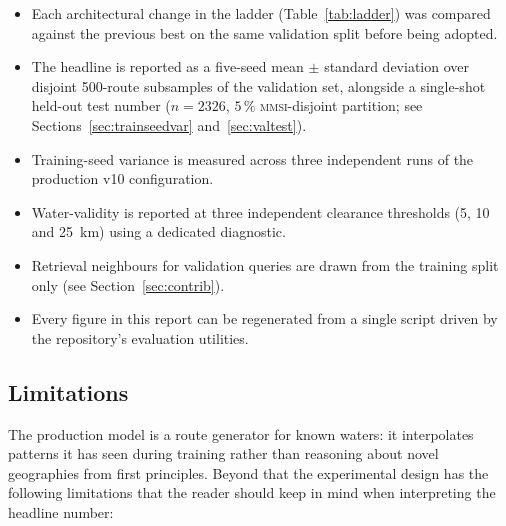 \documentclass[oneside, a4paper, onecolumn, 11pt]{article}
\begin{document}
\begin{itemize}[leftmargin=*]
  \item Each architectural change in the ladder (Table~\ref{tab:ladder})
        was compared against the previous best on the same validation
        split before being adopted.
  \item The headline is reported as a five-seed mean $\pm$ standard
        deviation over disjoint 500-route subsamples of the validation
        set, alongside a single-shot held-out test number
        ($n = 2326$, $5\,\%$ \textsc{mmsi}-disjoint partition; see
        Sections~\ref{sec:trainseedvar} and~\ref{sec:valtest}).
  \item Training-seed variance is measured across three independent
        runs of the production v10 configuration.
  \item Water-validity is reported at three independent clearance
        thresholds (5, 10 and 25~km) using a dedicated diagnostic.
  \item Retrieval neighbours for validation queries are drawn from the
        training split only (see Section~\ref{sec:contrib}).
  \item Every figure in this report can be regenerated from a single
        script driven by the repository's evaluation utilities.
\end{itemize}

\subsection{Limitations}\label{sec:limitations}

The production model is a route generator for known waters: it
interpolates patterns it has seen during training rather than
reasoning about novel geographies from first principles.  Beyond that
the experimental design has the following limitations that the reader
should keep in mind when interpreting the headline number:
\end{document}
